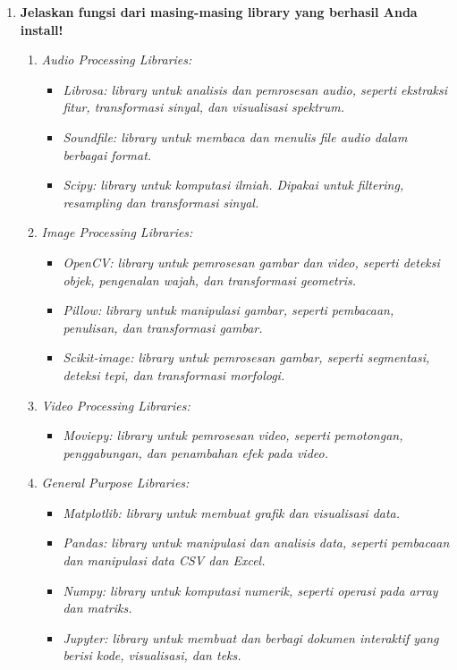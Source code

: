 \documentclass[11pt,a4paper]{article}
\begin{document}
\begin{enumerate}
    \item \textbf{Jelaskan fungsi dari masing-masing library yang berhasil Anda install!}
    \begin{enumerate}
        \item \textit{Audio Processing Libraries:}
        \begin{itemize}
        \item \textit{Librosa: library untuk analisis dan pemrosesan audio, seperti ekstraksi fitur, transformasi sinyal, dan visualisasi spektrum.}
        \item \textit{Soundfile: library untuk membaca dan menulis file audio dalam berbagai format.}
        \item \textit{Scipy: library untuk komputasi ilmiah. Dipakai untuk filtering, resampling dan transformasi sinyal.}
        \end{itemize}
        \item \textit{Image Processing Libraries:}
        \begin{itemize}
            \item \textit{OpenCV: library untuk pemrosesan gambar dan video, seperti deteksi objek, pengenalan wajah, dan transformasi geometris.}
            \item \textit{Pillow: library untuk manipulasi gambar, seperti pembacaan, penulisan, dan transformasi gambar.}
            \item \textit{Scikit-image: library untuk pemrosesan gambar, seperti segmentasi, deteksi tepi, dan transformasi morfologi.}
        \end{itemize}
        \item \textit{Video Processing Libraries:}
        \begin{itemize}
            \item \textit{Moviepy: library untuk pemrosesan video, seperti pemotongan, penggabungan, dan penambahan efek pada video.}
        \end{itemize}
        \item \textit{General Purpose Libraries:}
        \begin{itemize}
            \item \textit{Matplotlib: library untuk membuat grafik dan visualisasi data.}
            \item \textit{Pandas: library untuk manipulasi dan analisis data, seperti pembacaan dan manipulasi data CSV dan Excel.} 
            \item \textit{Numpy: library untuk komputasi numerik, seperti operasi pada array dan matriks.}  
            \item \textit{Jupyter: library untuk membuat dan berbagi dokumen interaktif yang berisi kode, visualisasi, dan teks.}
        \end{itemize}
    \end{enumerate}
\end{enumerate}
\end{document}
